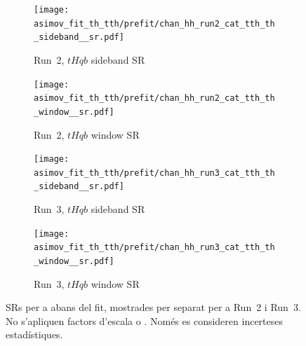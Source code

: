 \begin{figure}[htbp]
  \centering
  \begin{subfigure}[t]{0.45\textwidth}
    \centering
    \texttt{[image: asimov\_fit\_th\_tth/prefit/chan\_hh\_run2\_cat\_tth\_th\_sideband\_\_sr.pdf]}
    \caption{Run~2, $tHqb$ sideband SR}
  \end{subfigure}
  \hfill
  \begin{subfigure}[t]{0.45\textwidth}
    \centering
    \texttt{[image: asimov\_fit\_th\_tth/prefit/chan\_hh\_run2\_cat\_tth\_th\_window\_\_sr.pdf]}
    \caption{Run~2, $tHqb$ window SR}
  \end{subfigure}

  \vspace{0.4cm}
  \begin{subfigure}[t]{0.45\textwidth}
    \centering
    \texttt{[image: asimov\_fit\_th\_tth/prefit/chan\_hh\_run3\_cat\_tth\_th\_sideband\_\_sr.pdf]}
    \caption{Run~3, $tHqb$ sideband SR}
  \end{subfigure}
  \hfill
  \begin{subfigure}[t]{0.45\textwidth}
    \centering
    \texttt{[image: asimov\_fit\_th\_tth/prefit/chan\_hh\_run3\_cat\_tth\_th\_window\_\_sr.pdf]}
    \caption{Run~3, $tHqb$ window SR}
  \end{subfigure}

  \caption{SRs per a \thqb abans del fit, mostrades per separat per a Run~2 i Run~3.  
  No s’apliquen factors d’escala \ztautau o \ttbar.  
  Només es consideren incerteses estadístiques.}
    \label{res:fit_inputs_2}
\end{figure}

